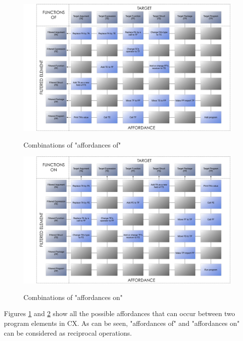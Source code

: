 \documentclass[11pt,fleqn,openany]{book} %
\begin{document}
\begin{figure}
\caption{Combinations of "affordances of"}
\centering
\includegraphics[width=1.0\textwidth]{img/functions-of.png}
\label{figure:combinations-of-affordances-of}
\end{figure}

\begin{figure}
\caption{Combinations of "affordances on"}
\centering
\includegraphics[width=1.0\textwidth]{img/functions-on.png}
\label{figure:combinations-of-affordances-on}
\end{figure}

Figures \ref{figure:combinations-of-affordances-of} and \ref{figure:combinations-of-affordances-on} show all the possible affordances that can occur between two program elements in CX. As can be seen, "affordances of" and "affordances on" can be considered as reciprocal operations.

\clearpage
\end{document}
